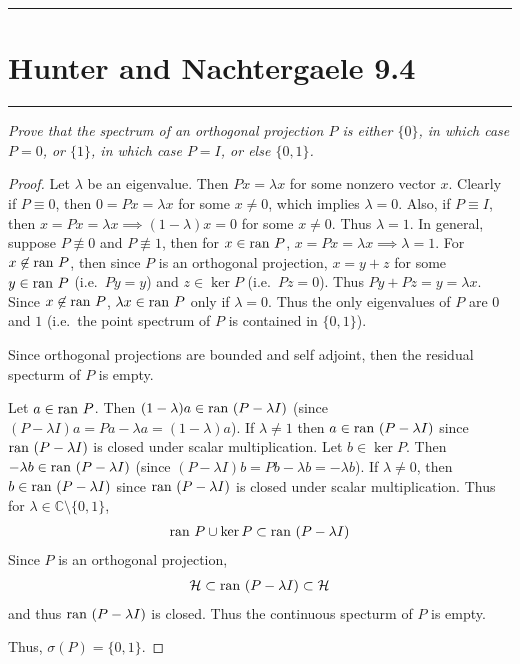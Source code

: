 \documentclass{article} %
\theoremstyle{plain}
\def\Cx{\mathbb{C}}
\newcommand{\ran}{\text{\rm ran }}
\newcommand{\Hilb}{\mathcal{H}}
\newcommand{\problem}[1]{
\vspace{.375cm}
\begin{minipage}{\textwidth}
    \begin{center}
        \noindent\rule{5cm}{1pt}
    \end{center}
    \section{\bf #1}
    \begin{center}
        \noindent\rule{5cm}{1pt}
    \end{center}
    \vspace{0.25cm}
\end{minipage}
}
\numberwithin{equation}{section} %
\numberwithin{figure}{section} %
\numberwithin{table}{section} %
\begin{document}
\problem{Hunter and Nachtergaele 9.4}
\emph{Prove that the spectrum of an orthogonal projection $P$ is either $\{0\}$, in which case $P = 0$, or $\{1\}$, in which case $P = I$, or else $\{0,1\}$.}
\begin{proof}
    Let $\lambda$ be an eigenvalue.  Then $Px = \lambda x$ for some nonzero vector $x$.  Clearly if $P \equiv 0$, then $0 = Px = \lambda x$ for some $x \neq 0$, which implies $\lambda = 0$.  Also, if $P \equiv I$, then $x = Px = \lambda x \implies (1 - \lambda)x = 0$ for some $x \neq 0$.  Thus $\lambda = 1$.  In general, suppose $P \not\equiv 0$ and $P \not\equiv 1$, then for $x \in \ran P$, $x = Px = \lambda x \implies \lambda = 1$.  For $x \not\in \ran P$, then since $P$ is an orthogonal projection, $x = y + z$ for some $y \in \ran P$ (i.e.~$Py = y$) and $z \in \ker P$ (i.e.~$Pz = 0$).  Thus $Py + Pz = y = \lambda x$.  Since $x \not\in \ran P$, $\lambda x \in \ran P$ only if $\lambda = 0$.  Thus the only eigenvalues of $P$ are $0$ and $1$ (i.e.~the point spectrum of $P$ is contained in $\{0,1\}$).

    Since orthogonal projections are bounded and self adjoint, then the residual specturm of $P$ is empty.

    Let $a \in \ran P$.  Then $(1 - \lambda)a \in \ran (P - \lambda I)$ (since $(P - \lambda I)a = Pa - \lambda a = (1 - \lambda)a$).  If $\lambda \neq 1$ then $a \in \ran (P - \lambda I)$ since $\ran(P - \lambda I)$ is closed under scalar multiplication.  Let $b \in \ker P$.  Then $-\lambda b \in \ran (P - \lambda I)$ (since $(P - \lambda I)b = Pb - \lambda b = -\lambda b$).  If $\lambda \neq 0$, then $b \in \ran (P - \lambda I)$ since $\ran(P - \lambda I)$ is closed under scalar multiplication.  Thus for $\lambda \in \Cx\setminus \{0,1\}$,
    \begin{align*}
        \ran P \cup \ker P \subset \ran (P - \lambda I)
    \end{align*}
    Since $P$ is an orthogonal projection,
    \begin{align*}
        \Hilb \subset \ran (P - \lambda I) \subset \Hilb
    \end{align*}
    and thus $\ran (P - \lambda I)$ is closed.  Thus the continuous specturm of $P$ is empty.

    Thus, $\sigma(P) = \{0,1\}$.
\end{proof}
\end{document}
